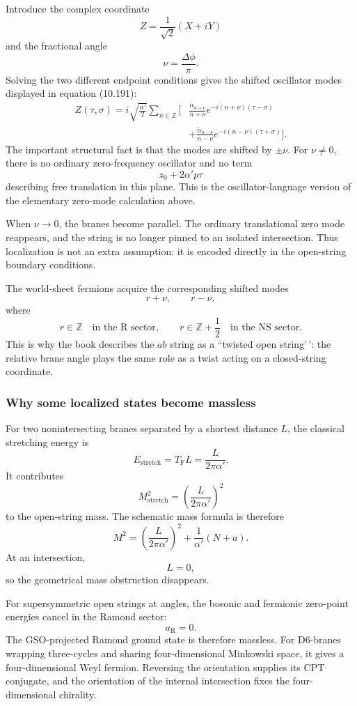 \documentclass[
  10pt,
  a4paper,
  openany]{book}
\begin{document}
Introduce the complex coordinate \[
Z=\frac1{\sqrt2}(X+iY)
\] and the fractional angle \[
\nu=\frac{\Delta\phi}{\pi}.
\] Solving the two different endpoint conditions gives the shifted
oscillator modes displayed in equation (10.191): \[
\begin{aligned}
Z(\tau,\sigma)
=i\sqrt{\frac{\alpha'}2}
\sum_{n\in\mathbb Z}
\Bigg[
&\frac{\alpha_{n+\nu}}{n+\nu}
e^{-i(n+\nu)(\tau-\sigma)}\\
&+\frac{\widetilde\alpha_{n-\nu}}{n-\nu}
e^{-i(n-\nu)(\tau+\sigma)}
\Bigg].
\end{aligned}
\] The important structural fact is that the modes are shifted by
\(\pm\nu\). For \(\nu\neq0\), there is no ordinary zero-frequency
oscillator and no term \[
z_0+2\alpha' p\tau
\] describing free translation in this plane. This is the
oscillator-language version of the elementary zero-mode calculation
above.

When \(\nu\to0\), the branes become parallel. The ordinary translational
zero mode reappears, and the string is no longer pinned to an isolated
intersection. Thus localization is not an extra assumption: it is
encoded directly in the open-string boundary conditions.

The world-sheet fermions acquire the corresponding shifted modes \[
r+\nu,
\qquad
r-\nu,
\] where \[
r\in\mathbb Z
\quad\text{in the R sector},
\qquad
r\in\mathbb Z+\frac12
\quad\text{in the NS sector}.
\] This is why the book describes the \(ab\) string as a ``twisted open
string'\,': the relative brane angle plays the same role as a twist
acting on a closed-string coordinate.

\subsubsection{Why some localized states become
massless}\label{why-some-localized-states-become-massless}

For two nonintersecting branes separated by a shortest distance \(L\),
the classical stretching energy is \[
E_{\mathrm{stretch}}
=T_{\mathrm F}L
=\frac{L}{2\pi\alpha'}.
\] It contributes \[
M^2_{\mathrm{stretch}}
=\left(\frac{L}{2\pi\alpha'}\right)^2
\] to the open-string mass. The schematic mass formula is therefore \[
M^2
=\left(\frac{L}{2\pi\alpha'}\right)^2
+\frac1{\alpha'}(N+a).
\] At an intersection, \[
L=0,
\] so the geometrical mass obstruction disappears.

For supersymmetric open strings at angles, the bosonic and fermionic
zero-point energies cancel in the Ramond sector: \[
a_{\mathrm R}=0.
\] The GSO-projected Ramond ground state is therefore massless. For
D6-branes wrapping three-cycles and sharing four-dimensional Minkowski
space, it gives a four-dimensional Weyl fermion. Reversing the
orientation supplies its CPT conjugate, and the orientation of the
internal intersection fixes the four-dimensional chirality.
\end{document}
